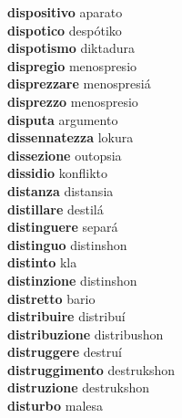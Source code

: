 \textbf{dispositivo } aparato \\
\textbf{dispotico } despótiko \\
\textbf{dispotismo } diktadura \\
\textbf{dispregio } menospresio \\
\textbf{disprezzare } menospresiá \\
\textbf{disprezzo } menospresio \\
\textbf{disputa } argumento \\
\textbf{dissennatezza } lokura \\
\textbf{dissezione } outopsia \\
\textbf{dissidio } konflikto \\
\textbf{distanza } distansia \\
\textbf{distillare } destilá \\
\textbf{distinguere } separá \\
\textbf{distinguo } distinshon \\
\textbf{distinto } kla \\
\textbf{distinzione } distinshon \\
\textbf{distretto } bario \\
\textbf{distribuire } distribuí \\
\textbf{distribuzione } distribushon \\
\textbf{distruggere } destruí \\
\textbf{distruggimento } destrukshon \\
\textbf{distruzione } destrukshon \\
\textbf{disturbo } malesa \\
